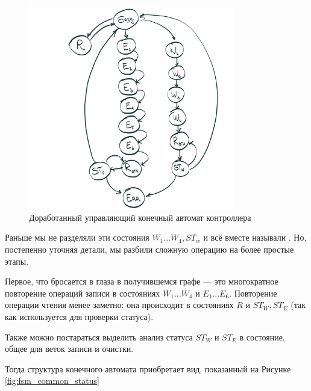 \begin{figure}[H]
\centering
% 
\includegraphics[width=0.8\textwidth]{./images/lab_6/fsm_extended}
\caption{Доработанный управляющий конечный автомат контроллера }
\label{fig:fsm_extended}
\end{figure}

\par{Раньше мы не разделяли эти состояния $W_1 ... W_4, ST_w$ и всё вместе называли . Но, постепенно уточняя детали, мы разбили сложную операцию на более простые этапы.}
\par{Первое, что бросается в глаза в получившемся графе --- это многократное повторение операций записи в состояниях $W_1 ... W_4$ и $E_1 ... E_6$. Повторение операции чтения менее заметно: она происходит в состояниях $R$ и $ST_W, ST_E$ (так как используется для проверки статуса).}
\par{Также можно постараться выделить анализ статуса $ST_W$ и $ST_E$ в состояние, общее для веток записи и очистки.}
\par{Тогда структура конечного автомата приобретает вид, показанный на Рисунке \ref{fig:fsm_common_status}}

